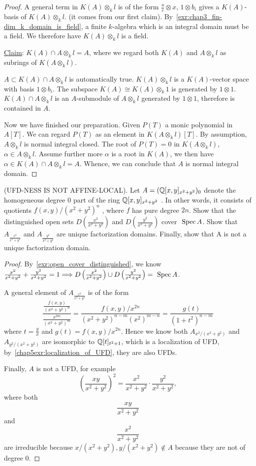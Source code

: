 \begin{proof}
A general term in $K(A)\otimes_k l$ is of the form $\frac{a}{c}\otimes x$, $1\otimes b_i$ gives a $K(A)$-basis of $K(A)\otimes_k l$. (it comes from our first claim). By~\ref{exr:chap3_fin-dim_k_domain_is_field}, a finite $k$-algebra which is an integral domain must be a field. We therefore have $K(A)\otimes_k l$ is a  field. 

\underline{Claim}: $K(A)\cap A\otimes_k l=A$, where we regard both $K(A)$ and $A\otimes_k l$ as subrings of $K(A\otimes_k l)$.

$A\subset K(A)\cap A\otimes_k l$ is automatically true. $K(A)\otimes_k l$ is a $K(A)$-vector space with basis $1\otimes b_i$. The subspace $K(A)\cong K(A)\otimes_k 1$ is generated by $1\otimes 1$. $K(A)\cap A\otimes_k l$ is an $A$-submodule of $A\otimes_k l$ generated by $1\otimes 1$, therefore is contained in $A$.

Now we have finished our preparation. Given $P(T)$ a monic polynomial in $A[T]$. We can regard $P(T)$ as an element in $K(A\otimes_k l)[T]$. By assumption, $A\otimes_k l$ is normal integral closed. The root of $P(T)=0$ in $K(A\otimes_k l)$, $\alpha\in A\otimes_k l$. Assume further more $\alpha$ is a root in $K(A)$, we then have $\alpha\in K(A)\cap A\otimes_k l=A$. Whence, we can conclude that $A$ is normal integral domain. 

\end{proof}
\begin{exr}
(UFD-NESS IS NOT AFFINE-LOCAL). Let $A = (\mathbb Q[x, y]_{x^2+y^2})_0$ denote the homogeneous degree $0$ part of the ring $\mathbb Q[x,y]_{x^2 +y^2}$ . In other words, it consists of quotients $f(x, y)/(x^2 + y^2)^n$ , where $f$ has pure degree $2n$. Show that the distinguished open sets $D\left( \frac{x^2}{x^2+y^2}\right)$ and $D\left( \frac{y^2}{x^2+y^2}\right)$ cover $\text{ Spec\,} A$. Show that $A_{\frac{x^2}{x^2+y^2}}$ and $A_{\frac{y^2}{x^2+y^2}}$
are unique factorization domains. Finally, show that A is not a unique factorization domain.
\end{exr}
\begin{proof}
By~\ref{exr:open_cover_distinguished}, we know 
$ \frac{x^2}{x^2+y^2}+ \frac{y^2}{x^2+y^2}=1\Longrightarrow D\left( \frac{x^2}{x^2+y^2}\right)\cup D\left( \frac{y^2}{x^2+y^2}\right)=\text{ Spec\,} A$.

A general element of $A_{\frac{x^2}{x^2+y^2}}$ is of the form
$$
\frac{\frac{f(x,y)}{(x^2+y^2)^n}}{\frac{x^{2m}}{(x^2+y^2)^m}}=\frac{f(x,y)/x^{2n}}{(x^2+y^2)^{n-m} (x^{2})^{m-n}}=\frac{g(t)}{(1+t^2)^{n-m}}
$$
where $t=\frac{y}{x}$ and $g(t)=f(x,y)/x^{2n}$. Hence we know both $A_{x^2/(x^2+y^2)}$ and $A_{y^2/(x^2+y^2)}$ are isomorphic to $\mathbb Q[t]_{t^2+1}$, which is a localization of UFD, by~\ref{chap5exr:localization_of_UFD}, they are also UFDs.

Finally, $A$ is not a UFD, for example
$$
\left(\frac{xy}{x^2+y^2}\right)^2=\frac{x^2}{x^2+y^2}\cdot \frac{y^2}{x^2+y^2},
$$
where both 
$$
\frac{xy}{x^2+y^2}
$$
and
$$
\frac{x^2}{x^2+y^2}
$$
are irreducible because $x/(x^2+y^2),y/(x^2+y^2)\notin A$ because they are not of degree $0$.
\end{proof}
